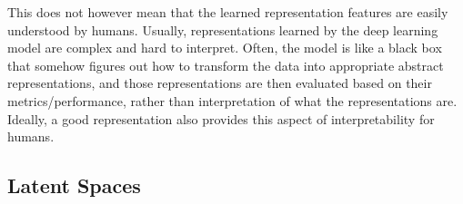 This does not however mean that the learned representation features are easily understood by humans. Usually, representations learned by the deep learning model are complex and hard to interpret. Often, the model is like a black box that somehow figures out how to transform the data into appropriate abstract representations, and those representations are then evaluated based on their metrics/performance, rather than interpretation of what the representations are. Ideally, a good representation also provides this aspect of interpretability for humans.



\subsection{Latent Spaces}
\label{seq:latent_space}


